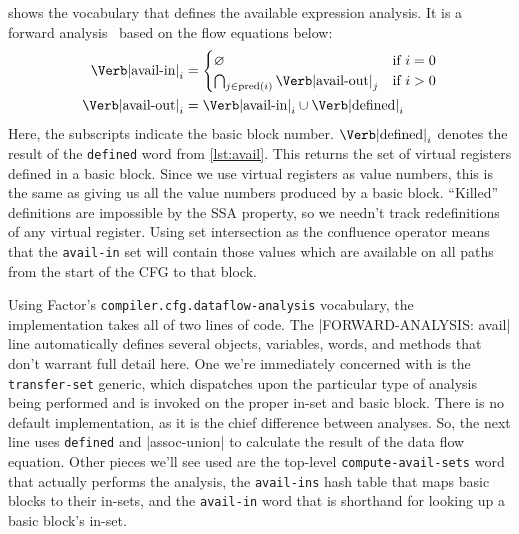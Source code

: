  shows the vocabulary that defines the available expression
analysis.  It is a forward analysis~ based on the flow equations
below:
\begin{align*}
  \text{\Verb|avail-in|}_i &=
    \begin{cases}
      \varnothing
        & \text{if $i=0$} \\
      \bigcap_{j\in\mathrm{pred}(i)}\text{\Verb|avail-out|}_j
        & \text{if $i>0$}
    \end{cases} \\
  \text{\Verb|avail-out|}_i &= \text{\Verb|avail-in|}_i
                                 \cup 
                                 \text{\Verb|defined|}_i
\end{align*}
%
\noindent Here, the subscripts indicate the basic block number.
$\text{\Verb|defined|}_i$ denotes the result of the \Verb|defined| word
from \vref{lst:avail}.  This returns the set of virtual registers defined in a
basic block.  Since we use virtual registers as value numbers, this is the same
as giving us all the value numbers produced by a basic block.  ``Killed''
definitions are impossible by the \gls{SSA} property, so we needn't track
redefinitions of any virtual register.  Using set intersection as the
confluence operator means that the \Verb|avail-in| set will contain those
values which are available on all paths from the start of the \gls{CFG} to that
block.

Using Factor's \Verb|compiler.cfg.dataflow-analysis| vocabulary, the
implementation takes all of two lines of code.  The
%
\factor|FORWARD-ANALYSIS: avail|
%
line automatically defines several objects, variables, words, and methods that
don't warrant full detail here.  One we're immediately concerned with is the
\Verb|transfer-set| generic, which dispatches upon the particular type of
analysis being performed and is invoked on the proper in-set and basic block.
There is no default implementation, as it is the chief difference between
analyses.  So, the next line uses \Verb|defined| and \factor|assoc-union| to
calculate the result of the data flow equation.  Other pieces we'll see used
are the top-level \Verb|compute-avail-sets| word that actually performs the
analysis, the \Verb|avail-ins| hash table that maps basic blocks to their
in-sets, and the \Verb|avail-in| word that is shorthand for looking up a
basic block's in-set.

